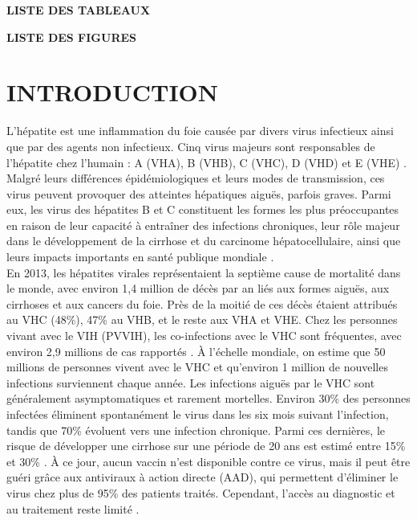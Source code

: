 \documentclass[a4paper,12pt]{article}
\begin{document}
\textbf{\huge LISTE DES TABLEAUX}
\vspace{1.5cm}

\listoftables
\clearpage
{}
{}

\textbf{\huge LISTE DES FIGURES}
\vspace{1.5cm}

\listoffigures


\clearpage
{}
\setcounter{page}{1}
\section*{INTRODUCTION}

L’hépatite est une inflammation du foie causée par divers virus infectieux ainsi que par des agents non infectieux. Cinq virus majeurs sont responsables de l’hépatite chez l’humain : A (VHA), B (VHB), C (VHC), D (VHD) et E (VHE) \cite{Hepatitisa}. Malgré leurs différences épidémiologiques et leurs modes de transmission, ces virus peuvent provoquer des atteintes hépatiques aiguës, parfois graves. Parmi eux, les virus des hépatites B et C constituent les formes les plus préoccupantes en raison de leur capacité à entraîner des infections chroniques, leur rôle majeur dans le développement de la cirrhose et du carcinome hépatocellulaire, ainsi que leurs impacts importants en santé publique mondiale \cite{Hepatitisa}.\\

En 2013, les hépatites virales représentaient la septième cause de mortalité dans le monde, avec environ 1,4 million de décès par an liés aux formes aiguës, aux cirrhoses et aux cancers du foie. Près de la moitié de ces décès étaient attribués au VHC (48\%), 47\% au VHB, et le reste aux VHA et VHE. Chez les personnes vivant avec le VIH (PVVIH), les co-infections avec le VHC sont fréquentes, avec environ 2,9 millions de cas rapportés \cite{OrganisationMondialeSante,VIHSidaHepatite2025}. À l’échelle mondiale, on estime que 50 millions de personnes vivent avec le VHC et qu’environ 1 million de nouvelles infections surviennent chaque année. Les infections aiguës par le VHC sont généralement asymptomatiques et rarement mortelles. Environ 30\% des personnes infectées éliminent spontanément le virus dans les six mois suivant l’infection, tandis que 70\% évoluent vers une infection chronique. Parmi ces dernières, le risque de développer une cirrhose sur une période de 20 ans est estimé entre 15\% et 30\% \cite{Hepatitisb}. À ce jour, aucun vaccin n’est disponible contre ce virus, mais il peut être guéri grâce aux antiviraux à action directe (AAD), qui permettent d’éliminer le virus chez plus de 95\% des patients traités. Cependant, l’accès au diagnostic et au traitement reste limité \cite{Hepatitisa,Hepatitisb}. \\
 
\end{document}
